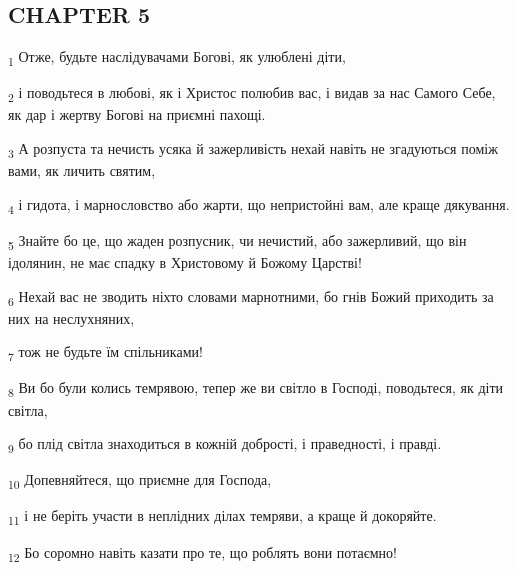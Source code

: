 \subsection{CHAPTER 5}
\begin{tcolorbox}
\textsubscript{1} Отже, будьте наслідувачами Богові, як улюблені діти,
\end{tcolorbox}
\begin{tcolorbox}
\textsubscript{2} і поводьтеся в любові, як і Христос полюбив вас, і видав за нас Самого Себе, як дар і жертву Богові на приємні пахощі.
\end{tcolorbox}
\begin{tcolorbox}
\textsubscript{3} А розпуста та нечисть усяка й зажерливість нехай навіть не згадуються поміж вами, як личить святим,
\end{tcolorbox}
\begin{tcolorbox}
\textsubscript{4} і гидота, і марнословство або жарти, що непристойні вам, але краще дякування.
\end{tcolorbox}
\begin{tcolorbox}
\textsubscript{5} Знайте бо це, що жаден розпусник, чи нечистий, або зажерливий, що він ідолянин, не має спадку в Христовому й Божому Царстві!
\end{tcolorbox}
\begin{tcolorbox}
\textsubscript{6} Нехай вас не зводить ніхто словами марнотними, бо гнів Божий приходить за них на неслухняних,
\end{tcolorbox}
\begin{tcolorbox}
\textsubscript{7} тож не будьте їм спільниками!
\end{tcolorbox}
\begin{tcolorbox}
\textsubscript{8} Ви бо були колись темрявою, тепер же ви світло в Господі, поводьтеся, як діти світла,
\end{tcolorbox}
\begin{tcolorbox}
\textsubscript{9} бо плід світла знаходиться в кожній добрості, і праведності, і правді.
\end{tcolorbox}
\begin{tcolorbox}
\textsubscript{10} Допевняйтеся, що приємне для Господа,
\end{tcolorbox}
\begin{tcolorbox}
\textsubscript{11} і не беріть участи в неплідних ділах темряви, а краще й докоряйте.
\end{tcolorbox}
\begin{tcolorbox}
\textsubscript{12} Бо соромно навіть казати про те, що роблять вони потаємно!
\end{tcolorbox}
